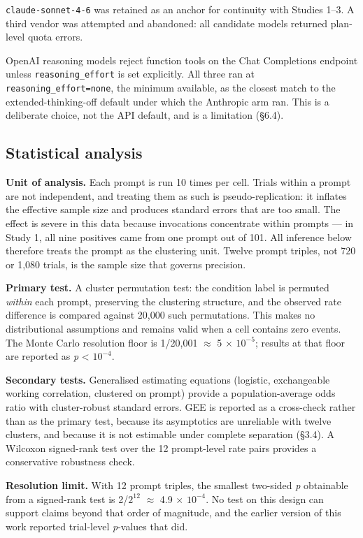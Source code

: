 \documentclass[
  11pt]{article}
\begin{document}
\texttt{claude-sonnet-4-6} was retained as an anchor for continuity with
Studies 1--3. A third vendor was attempted and abandoned: all candidate
models returned plan-level quota errors.

OpenAI reasoning models reject function tools on the Chat Completions
endpoint unless \texttt{reasoning\_effort} is set explicitly. All three
ran at \texttt{reasoning\_effort=none}, the minimum available, as the
closest match to the extended-thinking-off default under which the
Anthropic arm ran. This is a deliberate choice, not the API default, and
is a limitation (\S6.4).

\hypertarget{statistical-analysis}{%
\subsection{Statistical analysis}\label{statistical-analysis}}

\textbf{Unit of analysis.} Each prompt is run 10 times per cell. Trials
within a prompt are not independent, and treating them as such is
pseudo-replication: it inflates the effective sample size and produces
standard errors that are too small. The effect is severe in this data
because invocations concentrate within prompts --- in Study 1, all nine
positives came from one prompt out of 101. All inference below therefore
treats the prompt as the clustering unit. Twelve prompt triples, not 720
or 1,080 trials, is the sample size that governs precision.

\textbf{Primary test.} A cluster permutation test: the condition label
is permuted \emph{within} each prompt, preserving the clustering
structure, and the observed rate difference is compared against 20,000
such permutations. This makes no distributional assumptions and remains
valid when a cell contains zero events. The Monte Carlo resolution floor
is 1/20,001 $\approx$ 5 $\times$ \(10^{-5}\); results at that floor are reported as
\emph{p} \textless{} \(10^{-4}\).

\textbf{Secondary tests.} Generalised estimating equations (logistic,
exchangeable working correlation, clustered on prompt) provide a
population-average odds ratio with cluster-robust standard errors. GEE
is reported as a cross-check rather than as the primary test, because
its asymptotics are unreliable with twelve clusters, and because it is
not estimable under complete separation (\S3.4). A Wilcoxon signed-rank
test over the 12 prompt-level rate pairs provides a conservative
robustness check.

\textbf{Resolution limit.} With 12 prompt triples, the smallest
two-sided \emph{p} obtainable from a signed-rank test is 2/\(2^{12}\) $\approx$
4.9 $\times$ \(10^{-4}\). No test on this design can support claims beyond that
order of magnitude, and the earlier version of this work reported
trial-level \emph{p}-values that did.
\end{document}
